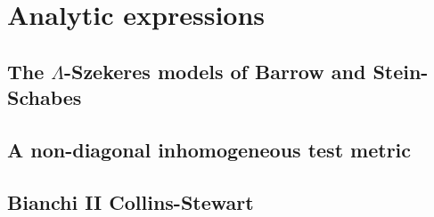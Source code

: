 \chapter{Analytic expressions} \label{app: analyticsolution}

\section{The \texorpdfstring{$\Lambda$}{TEXT}-Szekeres models of Barrow and Stein-Schabes} \label{app: analyticsolution_szekeres}

\section{A non-diagonal inhomogeneous test metric} \label{app: analyticsolution_testmetric}

\section{Bianchi II Collins-Stewart} \label{app: analyticsolution_BianchiII}